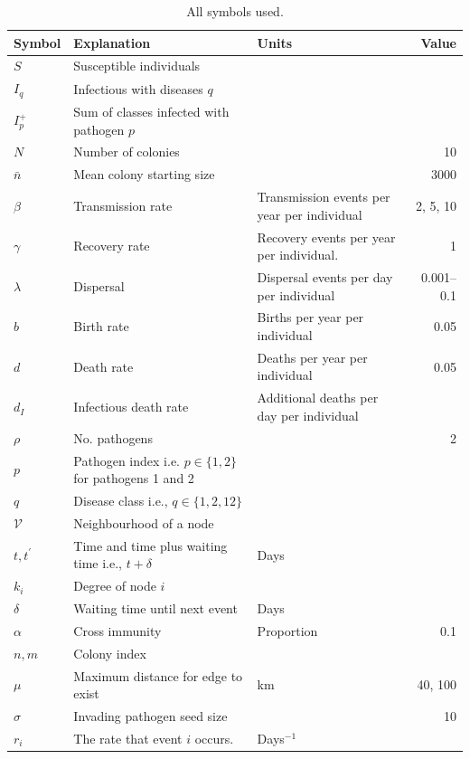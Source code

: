\begin{table}[b!]
\centering
\caption{All symbols used.}
\begin{tabular}{@{}lp{5.4cm}p{3.9cm}r@{}}
\toprule
Symbol & Explanation & Units&Value\\
\midrule
$S$ & Susceptible individuals &&\\
$I_q$ & Infectious with diseases $q$ &&\\
$I^+_p$ & Sum of classes infected with pathogen $p$ &\\
$N$ & Number of colonies&& 10\\
$\bar{n}$ & Mean colony starting size && 3000\\
$\beta$ & Transmission rate & Transmission events per year per individual& 2, 5, 10\\
$\gamma$ & Recovery rate & Recovery events per year per individual. & 1\\
$\lambda$ & Dispersal & Dispersal events per day per individual& 0.001--0.1\\
$b$ & Birth rate & Births per year per individual& 0.05\\
$d$ & Death rate & Deaths per year per individual & 0.05\\
$d_I$ & Infectious death rate & Additional deaths per day per individual&\\
$\rho$ & No. pathogens && 2\\
$p$ &  Pathogen index i.e. $p\in\{1,2\}$ for pathogens 1 and 2 & &\\
$q$ & Disease class i.e., $q\in\{1,2,12\}$&\\
$\mathcal{V}$ & Neighbourhood of a node &&\\
$t, t^\prime$ & Time and time plus waiting time i.e., $t+\delta$ & Days&\\
$k_i$ & Degree of node $i$ &&\\
$\delta$ & Waiting time until next event & Days&\\
$\alpha$ & Cross immunity & Proportion& 0.1\\
$n, m$ & Colony index &&\\
$\mu$ & Maximum distance for edge to exist & km& 40, 100\\
$\sigma$ & Invading pathogen seed size & & 10\\
$r_i$ & The rate that event $i$ occurs. & Days$^{-1}$&\\
\bottomrule
\end{tabular}

\label{t:params}
\end{table}




